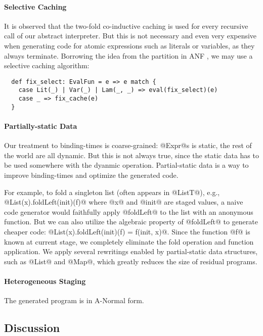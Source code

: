\paragraph{Selective Caching} It is observed that the two-fold co-inductive
caching is used for every recursive call of our abstract interpreter. But this
is not necessary and even very expensive when generating code for atomic
expressions such as literals or variables, as they always terminate. Borrowing
the idea from the partition in ANF \cite{Flanagan:1993:ECC:155090.155113}, we
may use a selective caching algorithm:

\begin{lstlisting}
  def fix_select: EvalFun = e => e match {
    case Lit(_) | Var(_) | Lam(_, _) => eval(fix_select)(e)
    case _ => fix_cache(e)
  }
\end{lstlisting}

\paragraph{Partially-static Data}

Our treatment to binding-times is coarse-grained: @Expr@s is static, the rest of
the world are all dynamic. But this is not always true, since the static data
has to be used somewhere with the dyanmic operation. Partial-static data is a
way to improve binding-times and optimize the generated code.

For example, to fold a singleton list (often appears in @ListT@), e.g.,
@List(x).foldLeft(init)(f)@ where @x@ and @init@ are staged values, a naive code
generator would faithfully apply @foldLeft@ to the list with an anonymous
function. But we can also utilize the algebraic property of @foldLeft@ to
generate cheaper code: @List(x).foldLeft(init)(f) = f(init, x)@. Since the
function @f@ is known at current stage, we completely eliminate the fold
operation and function application. We apply several rewritings enabled by
partial-static data structures, such as @List@ and @Map@, which greatly reduces
the size of residual programs.

\paragraph{Heterogeneous Staging} The generated program is in A-Normal form. 

\subsection{Discussion}

